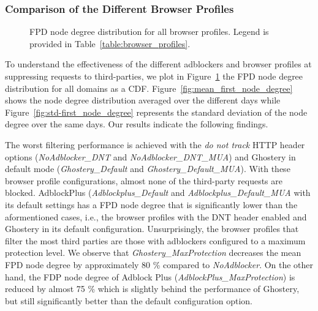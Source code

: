 \documentclass[compsoc, conference, letterpaper, 10pt, times]{IEEEtran}
\begin{document}
\subsubsection{Comparison of the Different Browser Profiles}


\begin{figure}
 \centering

  \hfill

 \caption{FPD node degree distribution for all browser profiles. Legend is provided in Table~\ref{table:browser_profiles}.}
 \label{fig:stdev_first_node_degree}
\end{figure}

To understand the effectiveness of the different adblockers and browser profiles at suppressing requests to third-parties, we plot in Figure~\ref{fig:stdev_first_node_degree} the FPD node degree distribution for all domains as a CDF. Figure~\ref{fig:mean_first_node_degree} shows the node degree distribution averaged over the different days while Figure~\ref{fig:std-first_node_degree} represents the standard deviation of the node degree over the same days. Our results indicate the following findings.

The worst filtering performance is achieved with the \textit{do not track} HTTP header options (\textit{NoAdblocker\_DNT} and \textit{NoAdblocker\_DNT\_MUA}) and Ghostery in default mode (\textit{Ghostery\_Default} and \textit{Ghostery\_Default\_MUA}). With these browser profile configurations, almost none of the third-party requests are blocked. AdblockPlus (\textit{Adblockplus\_Default} and \textit{Adblockplus\_Default\_MUA} with its default settings has a FPD node degree that is significantly lower than the aformentioned cases, i.e., the browser profiles with the DNT header enabled and Ghostery in its default configuration. Unsurprisingly, the browser profiles that filter the most third parties are those with adblockers configured to a maximum protection level. We observe that \textit{Ghostery\_MaxProtection} decreases the mean FPD node degree by approximately 80 \% compared to \textit{NoAdblocker}. On the other hand, the FDP node degree of Adblock Plus (\textit{AdblockPlus\_MaxProtection}) is reduced by almost 75 \% which is slightly behind the performance of Ghostery, but still significantly better than the default configuration option.
\end{document}
